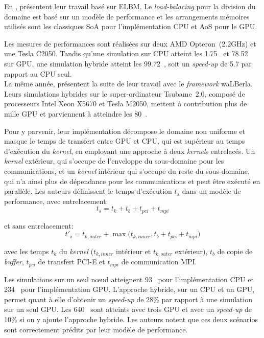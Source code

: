 En \citeyear{ye_parallel_2015}, \citet{ye_parallel_2015} présentent leur travail basé sur \ac{ELBM}. Le \textit{load-balacing} pour la division du domaine est basé sur un modèle de performance et les arrangements mémoires utilisés sont les classiques \acs{SoA} pour l'implémentation \acs{CPU} et \acs{AoS} pour le \acs{GPU}.

Les mesures de performances sont réalisées sur deux AMD Opteron\texttrademark~(2.2GHz) et une Tesla C2050. Tandis qu'une simulation sur \acs{CPU} atteint les 1.75~ et 78.52~ sur \acs{GPU}, une simulation hybride atteint les 99.72~, soit un \textit{speed-up} de 5.7 par rapport au \acs{CPU} seul.\\

La même année, \citet{feichtinger_performance_2015} présentent la suite de leur travail avec le \textit{framework} waLBerla. Leurs simulations hybrides sur le super-ordinateur Tsubame~2.0, composé de processeurs Intel Xeon X5670 et Tesla M2050, mettent à contribution plus de mille \acs{GPU} et parviennent à atteindre les 80~.

Pour y parvenir, leur implémentation décompose le domaine non uniforme et masque le temps de transfert entre \acs{GPU} et \acs{CPU}, qui est supérieur au temps d'exécution du \textit{kernel}, en employant une approche à deux \textit{kernel}s entrelacés. Un \textit{kernel} extérieur, qui s'occupe de l'enveloppe du sous-domaine pour les communications, et un \textit{kernel} intérieur qui s'occupe du reste du sous-domaine, qui n'a ainsi plus de dépendance pour les communications et peut être exécuté en parallèle. Les auteurs définissent le temps d'exécution $t_s$ dans un modèle de performance, avec entrelacement:
\begin{equation}
t_s = t_k + t_b + t_{pci} + t_{mpi}
\end{equation}

\noindent et sans entrelacement:
\begin{equation}
t'_s = t_{k,outer} + \max\Big(t_{k,inner}, t_b + t_{pci} + t_{mpi}\Big)
\end{equation}

\noindent avec les temps $t_k$ du \textit{kernel} ($t_{k,inner}$ intérieur et $t_{k,outer}$ extérieur), $t_b$ de copie de \textit{buffer}, $t_{pci}$ de transfert PCI-E et $t_{mpi}$ de communication MPI.

Les simulations sur un seul nœud atteignent 93~ pour l'implémentation \acs{CPU} et 234~ pour l'implémentation \acs{GPU}. L'approche hybride, sur un \acs{CPU} et un \acs{GPU}, permet quant à elle d'obtenir un \textit{speed-up} de 28\% par rapport à une simulation sur un seul \acs{GPU}. Les 640~ sont atteints avec trois \acs{GPU} et avec un \textit{speed-up} de 10\% si on y ajoute l'approche hybride. Les auteurs notent que ces deux scénarios sont correctement prédits par leur modèle de performance.


